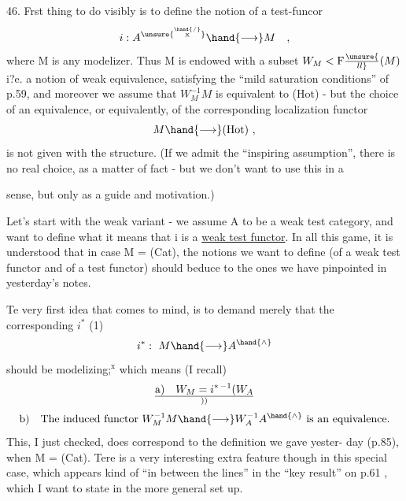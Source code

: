 46.   Frst thing to do visibly is to define  the notion of a test-funcor
\[ i : A^{\unsure{\overset{\hand{/}}{\mathrm{x}}}} \hand{\longrightarrow} M \quad , \]
where M is any modelizer. Thus M is endowed with a  subset $W_M < \mathrm{F}\unsure{\over{l}{l}}(M)$
 i?e. a notion of weak equivalence,  satisfying the ``mild saturation
conditions'' of p.59,  and moreover we assume that $W_M^{-1}M$  is equivalent to
(Hot)  -  but the choice of an equivalence,  or equivalently,  of the
corresponding localization functor
\[ M \hand{\longrightarrow} (\mathrm{Hot}) \ , \]
is not given with the structure.  (If we admit the ``inspiring assumption'',
there is no real choice,  as a matter of fact  -  but we don't want to use
this in a   sense,  but only as a guide and motivation.)

Let's start with the weak variant  -  we assume A to be a weak test
category,  and want to define what it means that i is a \uline{weak test functor}.
In all this game,  it is understood that in case M = (Cat),  the notions
we want to define (of a weak test functor and of a test functor) should
beduce to the ones we have pinpointed in yesterday's notes.

Te very first idea that comes to mind,  is to demand merely that
the corresponding  $i^*$  (1)
\[ i^*:\ M \hand{\longrightarrow} A^{\hand{\wedge}} \]
should be  modelizing;$^{\mathrm{x}}$  which means (I recall)
\[ \text{a)}\quad W_M = i^{*\,-1}(W_A\over{)}{)} \]
\[ \text{b)}\quad \text{The induced functor } W_M^{-1}M \hand{\longrightarrow} W_A^{-1}A^{\hand{\wedge}} \text{ is an equivalence.} \]
This,  I just checked,  does correspond to the definition we gave yester-%
day (p.85),  when  M = (Cat).  Tere is a very interesting extra feature
though in this special case,  which appears kind of ``in between the lines''
in the ``key result'' on p.61 ,  which I want  to state in the more general
set up.

